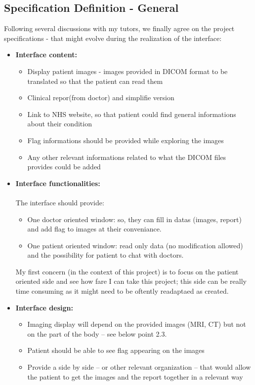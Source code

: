 \documentclass[12pt,twoside]{article}
\begin{document}
\subsection{Specification Definition - General}
Following several discussions with my tutors, we finally agree on the project specifications - that might evolve during the realization of the interface:
\begin{itemize}
	
\item \textbf{Interface content:}
\begin{itemize}
\item Display patient images - images provided in DICOM format to be translated so that the patient can read them
\item Clinical repor(from doctor) and simplifie version
\item Link to NHS website, so that patient could find general informations about their condition
\item Flag informations should be provided while exploring the images
\item Any other relevant informations related to what the DICOM files provides could be added 
\end{itemize}

\item \textbf{Interface functionalities:} \\ \\
The interface should provide:
\begin{itemize}
\item One doctor oriented window: so, they can fill in datas (images, report) and add flag to images at their conveniance.
\item One patient oriented window: read only data (no modification allowed) and the possibility for patient to chat with doctors.

\end{itemize}

My first concern (in the context of this project) is to focus on the patient oriented side and see how fare I can take this project; this side can be really time consuming as it might need to be oftently readaptaed as created.


\item \textbf{Interface design:}
\begin{itemize}
\item Imaging display will depend on the provided images (MRI, CT) but not on the part of the body – see below point 2.3.
\item Patient should be able to see flag appearing on the images
\item Provide a side by side – or other relevant organization – that would allow the patient to get the images and the report together in a relevant way


\end{itemize}
\end{itemize}
\end{document}
